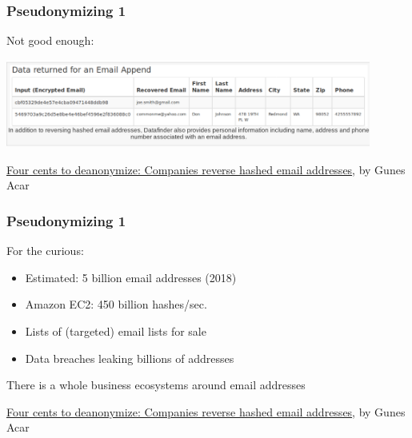 \documentclass[17pt,aspectratio=169,hyperref={pdfusetitle,colorlinks,allcolors=olive}]{beamer}
\begin{document}
\begin{frame}[fragile]
  \frametitle{Pseudonymizing 1}

Not good enough:

  \begin{center}
  \includegraphics[width=12cm]{figs/email-hash}
  \end{center}  

  \begin{flushright}
  {\small
\href{https://freedom-to-tinker.com/2018/04/09/four-cents-to-deanonymize-companies-reverse-hashed-email-addresses/}{Four cents to deanonymize: Companies reverse hashed email addresses}, by Gunes Acar
  }
  \end{flushright}  
\end{frame}

\begin{frame}[fragile]
  \frametitle{Pseudonymizing 1}

For the curious:

\begin{itemize}
\item Estimated: 5 billion email addresses (2018)
\item Amazon EC2: 450 billion hashes/sec.
\item Lists of (targeted) email lists for sale
\item Data breaches leaking billions of addresses
\end{itemize}

There is a whole business ecosystems around email addresses

  \begin{flushright}
  {\small
\href{https://freedom-to-tinker.com/2018/04/09/four-cents-to-deanonymize-companies-reverse-hashed-email-addresses/}{Four cents to deanonymize: Companies reverse hashed email addresses}, by Gunes Acar
  }
  \end{flushright}  

\end{frame}
\end{document}
